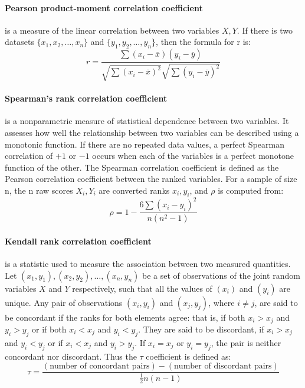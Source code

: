     \paragraph{Pearson product-moment correlation coefficient}\cite{Pearson} is a measure of the linear correlation between two variables $X, Y$. If there is two datasets $\{x_1,x_2,\dots, x_n\}$ and $\{y_1,y_2,\dots, y_n\}$, then the formula for r is\cite{pearsonr}:
    $$
    r = \frac{\sum{(x_i-\bar{x})(y_i-\bar{y})}}{\sqrt{\sum{(x_i-\bar{x})^2}}\sqrt{\sum{(y_i-\bar{y})^2}}}
    $$

    \paragraph{Spearman's rank correlation coefficient} is a nonparametric measure of statistical dependence between two variables. It assesses how well the relationship between two variables can be described using a monotonic function. If there are no repeated data values, a perfect Spearman correlation of $+1$ or $-1$ occurs when each of the variables is a perfect monotone function of the other\cite{Spearman}\cite{spearmanr}. The Spearman correlation coefficient is defined as the Pearson correlation coefficient between the ranked variables\cite{ranked variable}. For a sample of size n, the n raw scores $X_i,Y_i$ are converted ranks $x_i, y_i$, and $\rho$ is computed from:
    $$
    \rho = 1 - \frac{6\sum{(x_i-y_i)^2}}{n(n^2-1)}
    $$

    \paragraph{Kendall rank correlation coefficient} is a statistic used to measure the association between two measured quantities. Let $(x_1, y_1),(x_2, y_2),\dots,(x_n, y_n)$ be a set of observations of the joint random variables $X$ and $Y$ respectively, such that all the values of $(x_i)$ and $(y_i)$ are unique. Any pair of observations $(x_i,y_i)$ and $(x_j, y_j)$, where $i\neq j$, are said to be concordant if the ranks for both elements agree: that is, if both $x_i > x_j$ and $y_i > y_j$ or if both $x_i < x_j$ and $y_i < y_j$. They are said to be discordant, if $x_i > x_j$ and $y_i < y_j$ or if $x_i < x_j$ and $y_i > y_j$. If $x_i = x_j$ or $y_i = y_j$, the pair is neither concordant nor discordant. Thus the $\tau$ coefficient is defined as\cite{Kendall}\cite{kendalltau}:
    $$
    \tau = \frac{(\text{number of concordant pairs}) - (\text{number of discordant pairs})}{\frac{1}{2} n (n-1)}
    $$

